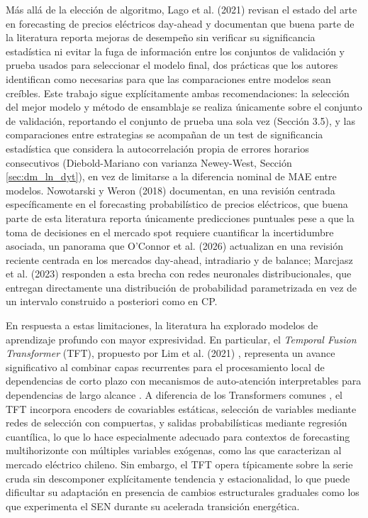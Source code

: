 Más allá de la elección de algoritmo, Lago et al. (2021) \cite{Lago2021Review} revisan el estado del arte en forecasting de precios eléctricos day-ahead y documentan que buena parte de la literatura reporta mejoras de desempeño sin verificar su significancia estadística ni evitar la fuga de información entre los conjuntos de validación y prueba usados para seleccionar el modelo final, dos prácticas que los autores identifican como necesarias para que las comparaciones entre modelos sean creíbles. Este trabajo sigue explícitamente ambas recomendaciones: la selección del mejor modelo y método de ensamblaje se realiza únicamente sobre el conjunto de validación, reportando el conjunto de prueba una sola vez (Sección 3.5), y las comparaciones entre estrategias se acompañan de un test de significancia estadística que considera la autocorrelación propia de errores horarios consecutivos (Diebold-Mariano con varianza Newey-West, Sección \ref{sec:dm_ln_dyt}), en vez de limitarse a la diferencia nominal de MAE entre modelos. Nowotarski y Weron (2018) \cite{NowotarskiWeron2018} documentan, en una revisión centrada específicamente en el forecasting probabilístico de precios eléctricos, que buena parte de esta literatura reporta únicamente predicciones puntuales pese a que la toma de decisiones en el mercado spot requiere cuantificar la incertidumbre asociada, un panorama que O'Connor et al. (2026) \cite{OConnorEvolution2026} actualizan en una revisión reciente centrada en los mercados day-ahead, intradiario y de balance; Marcjasz et al. (2023) \cite{Marcjasz2023} responden a esta brecha con redes neuronales distribucionales, que entregan directamente una distribución de probabilidad parametrizada en vez de un intervalo construido a posteriori como en CP.

En respuesta a estas limitaciones, la literatura ha explorado modelos de aprendizaje profundo con mayor expresividad. En particular, el \textit{Temporal Fusion Transformer} (TFT), propuesto por Lim et al. (2021) \cite{TFT}, representa un avance significativo al combinar capas recurrentes para el procesamiento local de dependencias de corto plazo con mecanismos de auto-atención interpretables para dependencias de largo alcance \cite{TFT}. A diferencia de los Transformers comunes \cite{Vaswani2017Attention}, el TFT incorpora encoders de covariables estáticas, selección de variables mediante redes de selección con compuertas, y salidas probabilísticas mediante regresión cuantílica, lo que lo hace especialmente adecuado para contextos de forecasting multihorizonte con múltiples variables exógenas, como las que caracterizan al mercado eléctrico chileno. Sin embargo, el TFT opera típicamente sobre la serie cruda sin descomponer explícitamente tendencia y estacionalidad, lo que puede dificultar su adaptación en presencia de cambios estructurales graduales como los que experimenta el SEN durante su acelerada transición energética.

